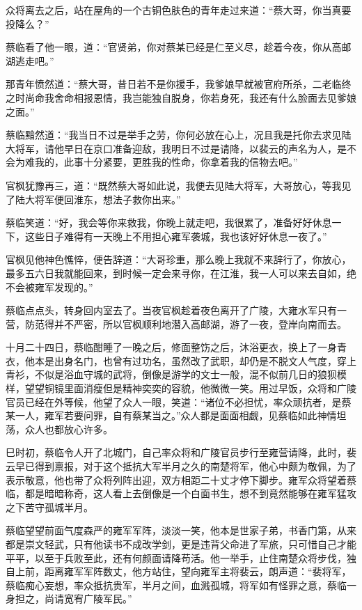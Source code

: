 众将离去之后，站在屋角的一个古铜色肤色的青年走过来道：“蔡大哥，你当真要投降么？”

蔡临看了他一眼，道：“官贤弟，你对蔡某已经是仁至义尽，趁着今夜，你从高邮湖逃走吧。”

那青年愤然道：“蔡大哥，昔日若不是你援手，我爹娘早就被官府所杀，二老临终之时尚命我舍命相报恩情，我岂能独自脱身，你若身死，我还有什么脸面去见爹娘之面。”

蔡临黯然道：“我当日不过是举手之劳，你何必放在心上，况且我是托你去求见陆大将军，请他早日在京口准备迎敌，我明日不过是请降，以裴云的声名为人，是不会为难我的，此事十分紧要，更胜我的性命，你拿着我的信物去吧。”

官枫犹豫再三，道：“既然蔡大哥如此说，我便去见陆大将军，大哥放心，等我见了陆大将军便回淮东，想法子救你出来。”

蔡临笑道：“好，我会等你来救我，你晚上就走吧，我很累了，准备好好休息一下，这些日子难得有一天晚上不用担心雍军袭城，我也该好好休息一夜了。”

官枫见他神色憔悴，便告辞道：“大哥珍重，那么晚上我就不来辞行了，你放心，最多五六日我就能回来，到时候一定会来寻你，在江淮，我一人可以来去自如，绝不会被雍军发现的。”

蔡临点点头，转身回内室去了。当夜官枫趁着夜色离开了广陵，大雍水军只有一营，防范得并不严密，所以官枫顺利地潜入高邮湖，游了一夜，登岸向南而去。

十月二十四日，蔡临酣睡了一晚之后，修面整饬之后，沐浴更衣，换上了一身青衣，他本是出身名门，也曾有过功名，虽然改了武职，却仍是不脱文人气度，穿上青衫，不似是浴血守城的武将，倒像是游学的文士一般，混不似前几日的狼狈模样，望望铜镜里面消瘦但是精神奕奕的容貌，他微微一笑。用过早饭，众将和广陵官员已经在外等候，他望了众人一眼，笑道：“诸位不必担忧，率众顽抗者，是蔡某一人，雍军若要问罪，自有蔡某当之。”众人都是面面相觑，见蔡临如此神情坦荡，众人也都放心许多。

巳时初，蔡临令人开了北城门，自己率众将和广陵官员步行至雍营请降，此时，裴云早已得到禀报，对于这个抵抗大军半月之久的南楚将军，他心中颇为敬佩，为了表示敬意，他也带了众将列阵出迎，双方相距二十丈才停下脚步。雍军众将望着蔡临，都是暗暗称奇，这人看上去倒像是一个白面书生，想不到竟然能够在雍军猛攻之下苦守孤城半月。

蔡临望望前面气度森严的雍军军阵，淡淡一笑，他本是世家子弟，书香门第，从来都是崇文轻武，只有他读书不成改学剑，更是违背父命进了军旅，只可惜自己才能平平，以至于兵败至此，还有何颜面请降苟活。他一举手，止住南楚众将步伐，独自上前，距离雍军军阵数丈，他方站住，望向雍军主将裴云，朗声道：“裴将军，蔡临痴心妄想，率众抵抗贵军，半月之间，血溅孤城，将军如有怪罪之意，蔡临一身担之，尚请宽宥广陵军民。”

